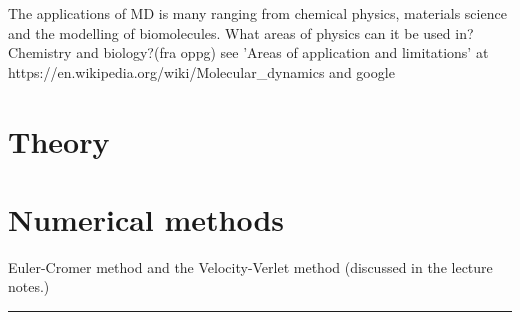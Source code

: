 \documentclass[11pt,a4wide]{article}
\begin{document}
The applications of MD is many ranging from chemical physics, materials science and the modelling of biomolecules.
What areas of physics can it be used in? Chemistry and biology?(fra oppg)
see 'Areas of application and limitations' at https://en.wikipedia.org/wiki/Molecular\_dynamics and google




\section{Theory}


\section{Numerical methods}
Euler-Cromer method and the Velocity-Verlet method (discussed in the lecture notes.)
  

\rule{0.3\textwidth}{0.4pt}\par %
\end{document}

